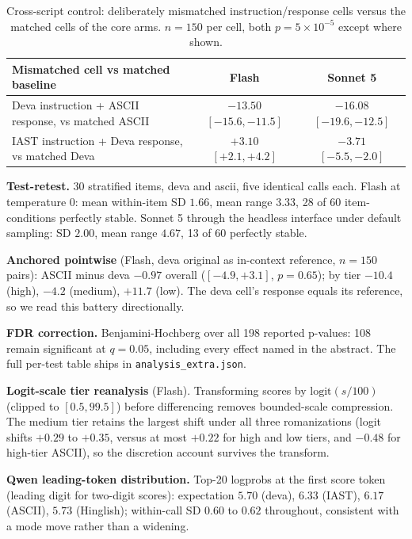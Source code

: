 \begin{table}[H]
\centering\small
\caption{Cross-script control: deliberately mismatched instruction/response cells versus the matched cells of the core arms. $n{=}150$ per cell, both $p = 5\times10^{-5}$ except where shown.}
\begin{tabular}{lcc}
\toprule
Mismatched cell vs matched baseline & Flash & Sonnet 5 \\
\midrule
Deva instruction + ASCII response, vs matched ASCII & $-13.50$ {\scriptsize$[-15.6, -11.5]$} & $-16.08$ {\scriptsize$[-19.6, -12.5]$} \\
IAST instruction + Deva response, vs matched Deva & $+3.10$ {\scriptsize$[+2.1, +4.2]$} & $-3.71$ {\scriptsize$[-5.5, -2.0]$} \\
\bottomrule
\end{tabular}
\end{table}

\textbf{Test-retest.} 30 stratified items, deva and ascii, five identical calls each. Flash at temperature 0: mean within-item SD $1.66$, mean range $3.33$, 28 of 60 item-conditions perfectly stable. Sonnet 5 through the headless interface under default sampling: SD $2.00$, mean range $4.67$, 13 of 60 perfectly stable.

\textbf{Anchored pointwise} (Flash, deva original as in-context reference, $n{=}150$ pairs): ASCII minus deva $-0.97$ overall ($[-4.9, +3.1]$, $p{=}0.65$); by tier $-10.4$ (high), $-4.2$ (medium), $+11.7$ (low). The deva cell's response equals its reference, so we read this battery directionally.

\textbf{FDR correction.} Benjamini-Hochberg over all 198 reported p-values: 108 remain significant at $q{=}0.05$, including every effect named in the abstract. The full per-test table ships in \texttt{analysis\_extra.json}.

\textbf{Logit-scale tier reanalysis} (Flash). Transforming scores by $\mathrm{logit}(s/100)$ (clipped to $[0.5, 99.5]$) before differencing removes bounded-scale compression. The medium tier retains the largest shift under all three romanizations (logit shifts $+0.29$ to $+0.35$, versus at most $+0.22$ for high and low tiers, and $-0.48$ for high-tier ASCII), so the discretion account survives the transform.

\textbf{Qwen leading-token distribution.} Top-20 logprobs at the first score token (leading digit for two-digit scores): expectation $5.70$ (deva), $6.33$ (IAST), $6.17$ (ASCII), $5.73$ (Hinglish); within-call SD $0.60$ to $0.62$ throughout, consistent with a mode move rather than a widening.


